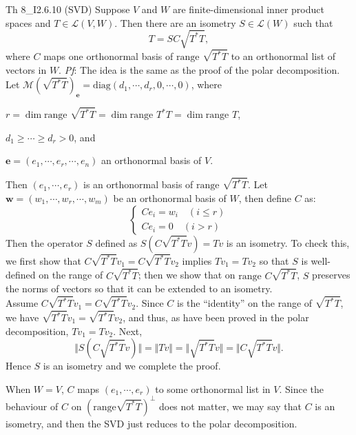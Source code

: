 \documentclass{article}
\begin{document}
\begin{Th}{Th 8\_I2.6.10 (SVD)}
    Suppose $V$ and $W$ are finite-dimensional inner product spaces and $T\in\mathcal{L}(V,W)$. Then there are an isometry $S\in\mathcal{L}(W)$ such that
    $$ T = SC\sqrt{T^\ast T}, $$
    where $C$ maps one orthonormal basis of $\text{range } \sqrt{T^\ast T}$ to an orthonormal list of vectors in $W$.
    \tcblower
    \textit{Pf}: The idea is the same as the proof of the polar decomposition. \\
    Let $\mathcal{M}(\sqrt{T^\ast T})_{\pmb{e}} = \text{diag}(d_1,\cdots,d_r,0,\cdots,0)$, where
    \begin{compactenum}
        \item $r = \dim\text{range } \sqrt{T^\ast T} = \dim\text{range }T^\ast T = \dim\text{range }T$,
        \item $d_1\geq\cdots\geq d_r > 0$, and
        \item $\pmb{e} = (e_1,\cdots,e_r,\cdots,e_n)$ an orthonormal basis of $V$.
    \end{compactenum}
    Then $(e_1,\cdots,e_r)$ is an orthonormal basis of $\text{range } \sqrt{T^\ast T}$. Let $\pmb{w} = (w_1,\cdots,w_r,\cdots,w_m)$ be an orthonormal basis of $W$, then define $C$ as:
    $$ \begin{cases}
        Ce_i = w_i \quad (i\leq r) \\
        Ce_i = 0 \quad (i>r)
    \end{cases} $$
    Then the operator $S$ defined as $S \left(C\sqrt{T^\ast T}v\right) = Tv$ is an isometry. To check this, we first show that $C\sqrt{T^\ast T}v_1 = C\sqrt{T^\ast T}v_2$ implies $Tv_1 = Tv_2$ so that $S$ is well-defined on the range of $C\sqrt{T^\ast T}$; then we show that on $\text{range } C\sqrt{T^\ast T}$, $S$ preserves the norms of vectors so that it can be extended to an isometry.\\
    Assume $C\sqrt{T^\ast T}v_1 = C\sqrt{T^\ast T}v_2$. Since $C$ is the ``identity'' on the range of $\sqrt{T^\ast T}$, we have $\sqrt{T^\ast T}v_1 = \sqrt{T^\ast T}v_2$, and thus, as have been proved in the polar decomposition, $Tv_1 = Tv_2$. Next, 
    $$ \Vert S(C\sqrt{T^\ast T}v)\Vert = \Vert Tv\Vert = \Vert \sqrt{T^\ast T}v\Vert = \Vert C\sqrt{T^\ast T}v\Vert. $$
    Hence $S$ is an isometry and we complete the proof.
\end{Th}

When $W = V$, $C$ maps $(e_1,\cdots,e_r)$ to some orthonormal list in $V$. Since the behaviour of $C$ on $(\text{range}\sqrt{T^\ast T})^\perp$ does not matter, we may say that $C$ is an isometry, and then the SVD just reduces to the polar decomposition.
\end{document}

